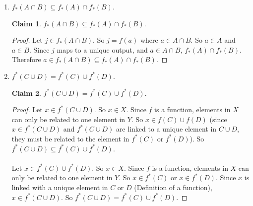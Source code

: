 \documentclass[11pt]{letter}
\theoremstyle{definition}
\newtheorem{claim}{Claim}
\begin{document}
\begin{description}
\begin{enumerate}
\begin{enumerate}
                                  
				\item $f_*(A\cap B)\subseteq f_*(A)\cap f_*(B)$.
                                  \begin{claim}
                                    $f_*(A\cap B)\subseteq f_*(A)\cap f_*(B)$.
                                  \end{claim}
                                  \begin{proof}
                                    Let $j\in f_*(A\cap B)$. So $j=f(a)$ where $a\in A\cap B$. So $a\in A$ and $a\in B$. Since $j$ maps to a unique output, and $a\in A\cap B$, $f_*(A)\cap f_*(B)$. Therefore $a\in f_*(A\cap B)\subseteq f_*(A)\cap f_*(B)$.
                                    \end{proof}
				\item $f^*(C\cup D)=f^*(C)\cup f^*(D)$.
                                  \begin{claim}
                                    $f^*(C\cup D)=f^*(C)\cup f^*(D)$.
                                  \end{claim}
                                  \begin{proof}
                                    Let $x\in f^*(C\cup D)$. So $x\in X$. Since $f$ is a function, elements in $X$ can only be related to one element in $Y$. So $x\in f(C)\cup f(D)$ (since $x\in f^*(C\cup D)$ and $f^*(C\cup D)$ are linked to a unique element in $C\cup D$, they must be related to the element in $f^*(C)$ or $f^*(D)$). So $f^*(C\cup D)\subseteq f^*(C)\cup f^*(D)$.\\ \\
                                    Let $x\in f^*(C)\cup f^*(D)$. So $x\in X$. Since $f$ is a function, elements in $X$ can only be related to one element in $Y$. So $x\in f^*(C)$ or $x\in f^*(D)$. Since $x$ is linked with a unique element in $C$ or $D$ (Definition of a function), $x\in f^*(C\cup D)$. So $f^*(C\cup D)=f^*(C)\cup f^*(D)$.
                                  \end{proof}
                                  

\end{enumerate}
\end{enumerate}
\end{description}
\end{document}
